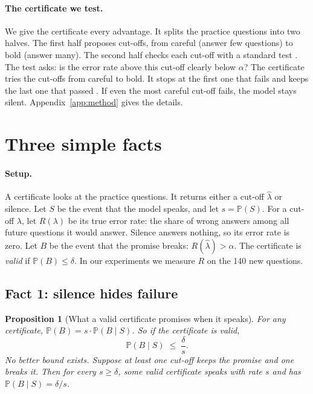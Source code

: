 \documentclass[11pt]{article}
\theoremstyle{plain}
\newtheorem{proposition}{Proposition}
\theoremstyle{definition}
\renewcommand{\Pr}{\mathbb{P}}
\begin{document}
\paragraph{The certificate we test.} We give the certificate every advantage. It splits the practice questions into two halves. The first half proposes cut-offs, from careful (answer few questions) to bold (answer many). The second half checks each cut-off with a standard test \citep{bates2021distribution}. The test asks: is the error rate above this cut-off clearly below $\alpha$? The certificate tries the cut-offs from careful to bold. It stops at the first one that fails and keeps the last one that passed \citep{angelopoulos2022ltt}. If even the most careful cut-off fails, the model stays silent. Appendix~\ref{app:method} gives the details.

\section{Three simple facts}
\label{sec:theory}

\paragraph{Setup.} A certificate looks at the practice questions. It returns either a cut-off $\hat\lambda$ or silence. Let $S$ be the event that the model speaks, and let $s = \Pr(S)$. For a cut-off $\lambda$, let $R(\lambda)$ be its true error rate: the share of wrong answers among all future questions it would answer. Silence answers nothing, so its error rate is zero. Let $B$ be the event that the promise breaks: $R(\hat\lambda) > \alpha$. The certificate is \emph{valid} if $\Pr(B) \le \delta$. In our experiments we measure $R$ on the 140 new questions.

\subsection{Fact 1: silence hides failure}

\begin{proposition}[What a valid certificate promises when it speaks]
\label{prop:silence}
For any certificate, $\Pr(B) = s \cdot \Pr(B \mid S)$. So if the certificate is valid,
\begin{equation}
\Pr(B \mid S) \;\le\; \frac{\delta}{s}.
\label{eq:silence}
\end{equation}
No better bound exists. Suppose at least one cut-off keeps the promise and one breaks it. Then for every $s \ge \delta$, some valid certificate speaks with rate $s$ and has $\Pr(B \mid S) = \delta / s$.
\end{proposition}
\end{document}
